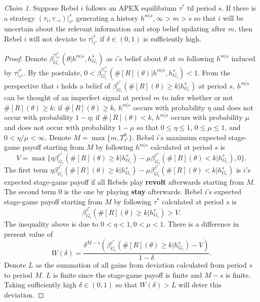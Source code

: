 \documentclass[12pt,letter]{article}
\theoremstyle{definition}
\theoremstyle{remark}
\theoremstyle{claim}
\newtheorem{claim}{Claim}
\begin{document}
\begin{claim}
\label{claim:uncertain}
Suppose Rebel $i$ follows an APEX equilibrium $\tau^{*}$ til period $s$. If there is a strategy $(\tau_i,\tau_{-i})|^s_{\tau^{*}}$  generating a history $h^{m|s}, \infty>m>s$ so that $i$ will be uncertain about the relevant information and stop belief updating after $m$, then Rebel $i$ will not deviate to $\tau|^s_{\tau^{*}}$ if $\delta\in(0,1)$ is sufficiently high.
\end{claim}

\begin{proof}
Denote $\beta^{\tau|^s_{\tau^{*}}}_{G_i}(\theta|h^{m|s}, h^s_{G_i})$ as $i$'s belief about $\theta$ at $m$ following $h^{m|s}$ induced by $\tau|^s_{\tau^{*}}$. By the postulate,  $0<\beta^{\tau|^s_{\tau^{*}}}_{G_i}(\#[R](\theta)|h^{m|s}, h^s_{G_i})<1$. From the perspective that $i$ holds a belief of $\beta^{\tau^{*}}_{G_i}(\#[R](\theta)\geq k|h^s_{G_i})$ at period $s$, $h^{m|s}$ can be thought of an imperfect signal at period $m$ to infer whether or not $\#[R](\theta)\geq k$: if $\#[R](\theta)\geq k$, $h^{m|s}$ occurs with probability $\eta$ and does not occur with probability $1-\eta$; if $\#[R](\theta)< k$, $h^{m|s}$ occurs with probability $\mu$ and does not occur with probability $1-\mu$ so that $0\leq \eta \leq 1$, $0\leq\mu\leq 1$, and $0<\eta/\mu<\infty$. Denote $M=\max\{m, T^{\theta}_{\tau^{*}}\}$. Rebel $i$'s maximum expected stage-game payoff starting from $M$ by following $h^{m|s}$ calculated at period $s$ is 
\[V=\max\{\eta\beta^{\tau^{*}}_{G_i}(\#[R](\theta)\geq k|h^s_{G_i})-\mu\beta^{\tau^{*}}_{G_i}(\#[R](\theta)< k|h^s_{G_i}),0\}.\]
The first term $\eta\beta^{\tau^{*}}_{G_i}(\#[R](\theta)\geq k|h^s_{G_i})-\mu\beta^{\tau^{*}}_{G_i}(\#[R](\theta)< k|h^s_{G_i})$ is $i$'s expected stage-game payoff if all Rebels play \textbf{revolt} afterwards starting from $M$.  The second term $0$ is the one by playing \textbf{stay} afterwards. Rebel $i$'s expected stage-game payoff starting from $M$ by following $\tau^{*}$ calculated at period $s$ is 
\[\beta^{\tau^{*}}_{G_i}(\#[R](\theta)\geq k|h^s_{G_i})>V.\]
The inequality above is due to $0<\eta<1,0<\mu<1$. There is a difference in present value of
\[W(\delta)=\frac{\delta^{M-s}(\beta^{\tau^{*}}_{G_i}(\#[R](\theta)\geq k|h^s_{G_i})-V)}{1-\delta}.\]
Denote $L$ as the summation of all gains from deviation calculated from period $s$ to period $M$. $L$ is finite since the stage-game payoff is finite and $M-s$ is finite. Taking sufficiently high $\delta\in(0,1)$ so that $W(\delta)>L$ will deter this deviation.
\end{proof}
\end{document}

